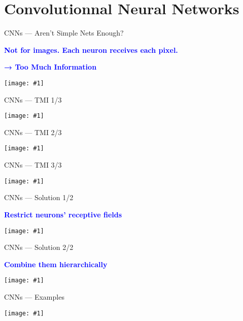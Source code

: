\documentclass{beamer}
\newcommand\blue[1]{\textcolor{blue}{#1}}
\newcommand\cimg[1]{\vfill\centerline{\texttt{[image: \#1]}}\vfill}
\newcommand\cimgg[1]{\vfill\centerline{\texttt{[image: \#1]}}\vfill}
\newcommand\cimggg[1]{\vfill\centerline{\texttt{[image: \#1]}}\vfill}
\newcommand\vphrase[1]{\vfill\centerline{\large\bf\blue{#1}}\vfill}
\begin{document}
\section{Convolutionnal Neural Networks}
\label{sec:convnets}
\begin{frame}{CNNs --- Aren't Simple Nets Enough?}
  \vphrase{Not for images. Each neuron receives each pixel.}
  \vphrase{→ Too Much Information}
  \vfill
  \cimgg{tmi.jpg}
  \vfill
\end{frame}
\begin{frame}{CNNs --- TMI 1/3}
  \cimgg{park.jpg}
\end{frame}
\begin{frame}{CNNs --- TMI 2/3}
  \cimgg{station.jpg}
\end{frame}
\begin{frame}{CNNs --- TMI 3/3}
  \cimgg{street.jpg}
\end{frame}
\begin{frame}{CNNs --- Solution 1/2}
  \vphrase{Restrict neurons' receptive fields}
  \cimggg{kernel.jpg}
\end{frame}
\begin{frame}{CNNs --- Solution 2/2}
  \vphrase{Combine them hierarchically}
  \cimg{cnn.jpg}
\end{frame}
\begin{frame}{CNNs --- Examples}
  \cimg{hierarchical-features.png}
\end{frame}
\end{document}
